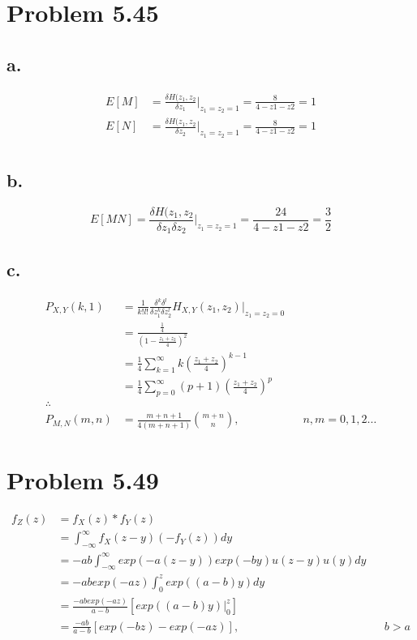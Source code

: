 \documentclass[12pt]{article}
\begin{document}
\section{Problem 5.45}
\subsection{a.}
\begin{align*}
  E[M] &= \frac{\delta H(z_1,z_2}{\delta z_1}\big|_{z_1 = z_2 = 1} = \frac{8}{4-z1-z2} = 1 \\
  E[N] &= \frac{\delta H(z_1,z_2}{\delta z_2}\big|_{z_1 = z_2 = 1} = \frac{8}{4-z1-z2} = 1 \\
\end{align*}

\subsection{b.}
\[
E[MN] = \frac{\delta H(z_1,z_2}{\delta z_1 \delta z_2}\big|_{z_1 = z_2 = 1} = \frac{24}{4-z1-z2} = \frac{3}{2}
\]

\subsection{c.}
\begin{align*}
  P_{X,Y}(k,1) &= \frac{1}{k!l!} \frac{\delta^k \delta^l}{\delta z_1^k \delta z_2^l} H_{X,Y}(z_1,z_2)\big|_{z_1=z_2=0} \\
  &= \frac{\frac{1}{4}}{(1-\frac{z_1+z_2}{4})^2} \\
  &= \frac{1}{4} \sum_{k=1}^\infty k \left(\frac{z_1+z_2}{4}\right)^{k-1} \\
  &= \frac{1}{4} \sum_{p=0}^\infty (p+1) \left(\frac{z_1+z_2}{4}\right)^p \\
  \therefore \\
  P_{M,N}(m,n) &= \frac{m+n+1}{4(m+n+1)} \binom{m+n}{n}, & & n,m = 0 , 1 , 2 \dots
\end{align*}

\section{Problem 5.49}
\begin{align*}
f_Z(z) &= f_X(z) * f_Y(z) \\
&= \int_{-\infty}^\infty f_X(z-y)(-f_Y(z))dy \\
&= -ab\int_{-\infty}^\infty exp(-a(z-y))exp(-by)u(z-y)u(y)dy \\
&= -abexp(-az)\int_{0}^z exp((a-b)y)dy \\
&= \frac{-abexp(-az)}{a-b}\left[ exp((a-b)y)\big|_0^z \right] \\
&= \frac{-ab}{a-b}\left[ exp(-bz)-exp(-az) \right], & & b>a
\end{align*}
\end{document}
